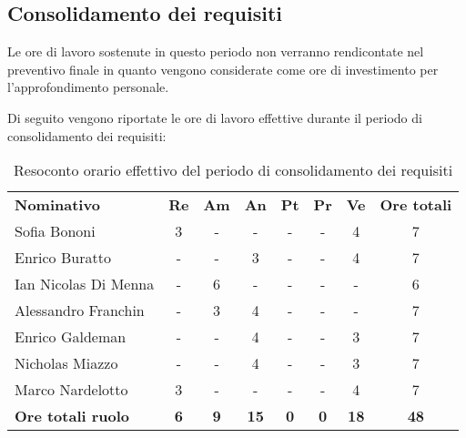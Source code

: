 \documentclass[../piano-di-progetto.tex]{subfiles}
\begin{document}
\subsection{Consolidamento dei requisiti}
Le ore di lavoro sostenute in questo periodo non verranno rendicontate nel preventivo finale in quanto vengono considerate come ore di investimento per l'approfondimento personale.

Di seguito vengono riportate le ore di lavoro effettive durante il periodo di consolidamento dei requisiti:
\begin{table}[H]
    \centering
    \begin{tabular}{lccccccc}
      \rowcolor{lightgray}
      \textbf{Nominativo}       & \textbf{Re}      & \textbf{Am} & \textbf{An}      & \textbf{Pt} & \textbf{Pr} & \textbf{Ve} & \textbf{Ore totali} \\
            Sofia Bononi              & 3          & -          & -           & -          & -          & 4           & 7           \\
      Enrico Buratto            & -          & -          & 3           & -          & -          & 4           & 7           \\
      Ian Nicolas Di Menna      & -          & 6          & -           & -          & -          & -           & 6           \\
      Alessandro Franchin       & -          & 3          & 4           & -          & -          & -           & 7           \\
      Enrico Galdeman           & -          & -          & 4           & -          & -          & 3           & 7           \\
      Nicholas Miazzo           & -          & -          & 4           & -          & -          & 3           & 7           \\
      Marco Nardelotto          & 3          & -          & -           & -          & -          & 4           & 7           \\
      \textbf{Ore totali ruolo} & \textbf{6} & \textbf{9} & \textbf{15} & \textbf{0} & \textbf{0} & \textbf{18} & \textbf{48}
      
    \end{tabular}
    \caption{Resoconto orario effettivo del periodo di consolidamento dei requisiti}
  \end{table}
\end{document}
